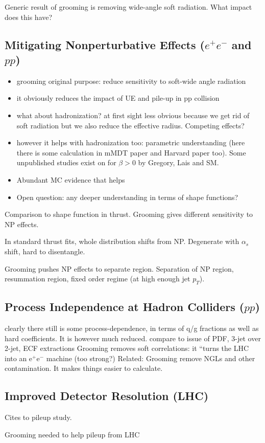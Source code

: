 

Generic result of grooming is removing wide-angle soft radiation.  What impact does this have?

\subsection{Mitigating Nonperturbative Effects ($e^+e^-$ and $pp$)}

\begin{itemize}
\item grooming original purpose: reduce sensitivity to soft-wide angle radiation
\item it obviously reduces the impact of UE and pile-up in pp collision
\item what about hadronization? at first sight less obvious because we get rid of soft radiation but we also reduce the effective radius. Competing effects?
\item however it helps with hadronization too: parametric understanding (here there is some calculation in mMDT paper and Harvard paper too). Some unpublished studies exist on  for $\beta>0$ by Gregory, Lais and SM. 
\item Abundant MC evidence that helps
\item Open question: any deeper understanding in terms of shape functions?
\end{itemize}

Comparison to shape function in thrust.  Grooming gives different sensitivity to NP effects.

In standard thrust fits, whole distribution shifts from NP.  Degenerate with $\alpha_s$ shift, hard to disentangle.

Grooming pushes NP effects to separate region.  Separation of NP region, resummation region, fixed order regime (at high enough jet $p_T$).

\subsection{Process Independence at Hadron Colliders ($pp$)}
clearly there still is some process-dependence, in terms of q/g fractions as well as hard coefficients. It is however much reduced.
compare to issue of PDF, 3-jet over 2-jet, ECF extractions
Grooming removes soft correlations: it ``turns the LHC into an e$^+$e$^-$ machine (too strong?)
Related:  Grooming remove NGLs and other contamination. It makes things easier to calculate. 


\subsection{Improved Detector Resolution (LHC)}

Cites to pileup study.

Grooming needed to help pileup from LHC
